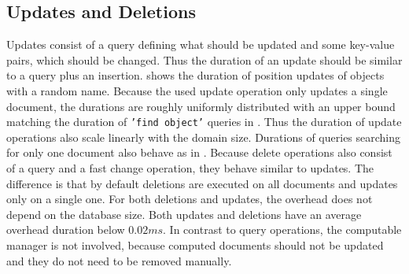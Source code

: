 \subsection{Updates and Deletions}
\label{sec:updates}
Updates consist of a query defining what should be updated and some
key-value pairs, which should be changed. Thus the duration of an
update should be similar to a query plus an
insertion.  shows the duration of
position updates of objects with a random name. Because the used
update operation only updates a single document, the durations are
roughly uniformly distributed with an upper bound matching the
duration of \texttt{'find object'} queries in
. Thus the duration of update operations
also scale linearly with the domain size. Durations of queries
searching for only one document also behave as in
.  Because delete operations also consist
of a query and a fast change operation, they behave similar to
updates. The difference is that by default deletions are executed on
all documents and updates only on a single one. For both deletions and
updates, the overhead does not depend on the database size. Both
updates and deletions have an average overhead duration below
$0.02ms$. In contrast to query operations, the computable manager
is not involved, because computed documents should not be updated and
they do not need to be removed manually.

